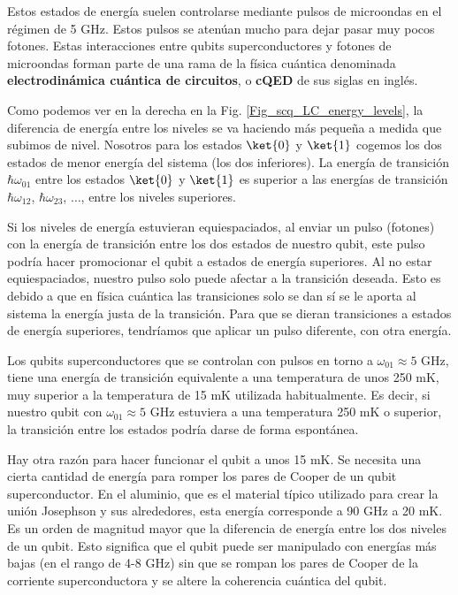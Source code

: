 Estos estados de energía suelen controlarse mediante pulsos de microondas en el régimen de 5 GHz. Estos pulsos se atenúan mucho para dejar pasar muy pocos fotones. Estas interacciones entre qubits superconductores y fotones de microondas forman parte de una rama de la física cuántica denominada \textbf{electrodinámica cuántica de circuitos}, o \textbf{cQED} de sus siglas en inglés.

Como podemos ver en la derecha en la Fig. \ref{Fig_scq_LC_energy_levels}, la diferencia de energía entre los niveles se va haciendo más pequeña a medida que subimos de nivel. Nosotros para los estados $\ket{0}$ y $\ket{1}$ cogemos los dos estados de menor energía del sistema (los dos inferiores). La energía de transición $\hbar \omega_{01}$ entre los estados $\ket{0}$ y $\ket{1}$ es superior a las energías de transición $\hbar \omega_{12}$, $\hbar \omega_{23}$, $\dots$, entre los niveles superiores.  

Si los niveles de energía estuvieran equiespaciados, al enviar un pulso (fotones) con la energía de transición entre los dos estados de nuestro qubit, este pulso podría hacer promocionar el qubit a estados de energía superiores. Al no estar equiespaciados, nuestro pulso solo puede afectar a la transición deseada. Esto es debido a que en física cuántica las transiciones solo se dan sí se le aporta al sistema la energía justa de la transición. Para que se dieran transiciones a estados de energía superiores, tendríamos que aplicar un pulso diferente, con otra energía.


Los qubits superconductores que se controlan con pulsos en torno a $\omega_{01} \approx 5$ GHz, tiene una energía de transición equivalente a una temperatura de unos 250 mK, muy superior a la temperatura de 15 mK utilizada habitualmente. Es decir, si nuestro qubit con $\omega_{01} \approx 5$ GHz estuviera a una temperatura 250 mK o superior, la transición entre los estados podría darse de forma espontánea. 

Hay otra razón para hacer funcionar el qubit a unos 15 mK. Se necesita una cierta cantidad de energía para romper los pares de Cooper de un qubit superconductor. En el aluminio, que es el material típico utilizado para crear la unión Josephson y sus alrededores, esta energía corresponde a 90 GHz a 20 mK. Es un orden de magnitud mayor que la diferencia de energía entre los dos niveles de un qubit. Esto significa que el qubit puede ser manipulado con energías más bajas (en el rango de 4-8 GHz) sin que se rompan los pares de Cooper de la corriente superconductora y se altere la coherencia cuántica del qubit. 


